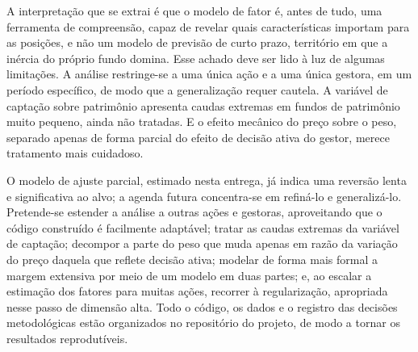 \documentclass[12pt,a4paper]{article}
\begin{document}
A interpretação que se extrai é que o modelo de fator é, antes de tudo, uma ferramenta de
compreensão, capaz de revelar quais características importam para as posições, e não um modelo
de previsão de curto prazo, território em que a inércia do próprio fundo domina. Esse achado
deve ser lido à luz de algumas limitações. A análise restringe-se a uma única ação e a uma
única gestora, em um período específico, de modo que a generalização requer cautela. A
variável de captação sobre patrimônio apresenta caudas extremas em fundos de patrimônio
muito pequeno, ainda não tratadas. E o efeito mecânico do preço sobre o peso, separado apenas
de forma parcial do efeito de decisão ativa do gestor, merece tratamento mais cuidadoso.

O modelo de ajuste parcial, estimado nesta entrega, já indica uma reversão lenta e significativa
ao alvo; a agenda futura concentra-se em refiná-lo e generalizá-lo. Pretende-se estender a
análise a outras ações e gestoras, aproveitando que o código construído é facilmente adaptável;
tratar as caudas extremas da variável de captação; decompor a parte do peso que muda apenas em
razão da variação do preço daquela que reflete decisão ativa; modelar de forma mais formal a
margem extensiva por meio de um modelo em duas partes; e, ao escalar a estimação dos fatores
para muitas ações, recorrer à regularização, apropriada nesse passo de dimensão alta. Todo o
código, os dados e o registro das decisões metodológicas estão organizados no repositório do
projeto, de modo a tornar os resultados reprodutíveis.

\newpage
{}
\end{document}
